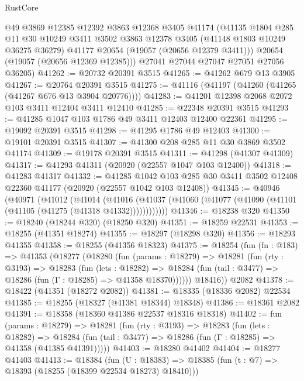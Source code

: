 \begin{lexlean}{RustCore}
\begin{coremodule}
        @49
        @3869
        @12385
        @12392
        @3863
        @12368
        @3405
        @41174
        (@41135
          @1804
          @285
          @11
          @30
          @10249
          @3411
          @3502
          @3863
          @12378
          @3405
          (@41148 @1803 @10249 @36275 @36279)
          @41177
          @20654
          (@19057 (@20656 @12379 @3411)))
        @20654
        (@19057 (@20656 @12369 @12385)))
      @27041
      @27044
      @27047
      @27051
      @27056
      @36205)
@41262 := @20732 @20391 @3515
@41265 := @41262 @679 @13 @3905
@41267 := @20764 @20391 @3515
@41275 := @41116 (@41197 (@41260 (@41265 (@41267 @676 @13 @3904 @20776))))
@41283 := @41201 @12398 @2068 @2072 @103 @3411 @12404 @3411 @12410
@41285 := @22348 @20391 @3515
@41293 := @41285 @1047 @103 @1786 @49 @3411 @12403 @12400 @22361
@41295 := @19092 @20391 @3515
@41298 := @41295 @1786 @49 @12403
@41300 := @19101 @20391 @3515
@41307 := @41300 @208 @285 @11 @30 @3869 @3502 @41174
@41309 := @19178 @20391 @3515
@41311 := @41298 (@41307 @41309)
@41317 := @41293 @41311 (@20920 (@22557 @1047 @103 @12400))
@41318 := @41283 @41317
@41332 := @41285
    @1042
    @103
    @285
    @30
    @3411
    @3502
    @12408
    @22360
    @41177
    (@20920 (@22557 @1042 @103 @12408))
@41345 := @40946
    (@40971
      (@41012
        (@41014
          (@41016 (@41037 (@41060 (@41077 (@41090 (@41101 (@41105 (@41275 (@41318 @41332))))))))))))
@41346 := @18238 @320
@41350 := @18240 (@18244 @320) (@18250 @320)
@41351 := @18259 @22531
@41353 := @18255 (@41351 @18274)
@41355 := @18297 (@18298 @320)
@41356 := @18293 @41355
@41358 := @18255 (@41356 @18323)
@41375 := @18254
    (fun (fn : @183) =>
    @41353
      (@18277
        (@18280
          (fun (params : @18279) =>
          @18281
            (fun (rty : @3193) =>
            @18283
              (fun (lets : @18282) =>
              @18284 (fun (tail : @3477) => @18286 (fun (Γ : @18285) => @41358 @18370))))))
        @18416))
    @2082
@41378 := @18422 (@41351 (@18272 @2082))
@41381 := @18335 (@18336 @2082) @22534
@41385 := @18255 (@18327 (@41381 @18344) @18348)
@41386 := @18361 @2082
@41391 := @18358 (@18360 @41386 @22537 @18316 @18318)
@41402 := fun (params : @18279) =>
  @18281
    (fun (rty : @3193) =>
    @18283
      (fun (lets : @18282) =>
      @18284 (fun (tail : @3477) => @18286 (fun (Γ : @18285) => @41358 (@41385 @41391)))))
@41403 := @18280 @41402
@41404 := @18277 @41403
@41413 := @18384
    (fun (U : @18383) => @18385 (fun (t : @7) => @18393 (@18255 (@18399 @22534 @18273) @18410)))

\end{coremodule}
\end{lexlean}
